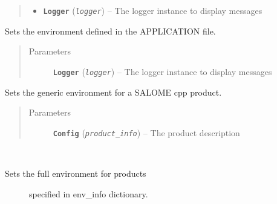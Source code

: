 \documentclass[a4paper,10pt,english]{sphinxmanual}
\begin{document}
\begin{fulllineitems}
\begin{fulllineitems}
\begin{quote}
\begin{description}
\begin{itemize}
\item {} 
\textbf{\texttt{Logger}} (\emph{\texttt{logger}}) -- The logger instance to display messages

\end{itemize}

\end{description}\end{quote}

\end{fulllineitems}


\begin{fulllineitems}
\label{commands/apidoc/src:src.environment.SalomeEnviron.set_application_env}
Sets the environment defined in the APPLICATION file.
\begin{quote}\begin{description}
\item[{Parameters}] \leavevmode
\textbf{\texttt{Logger}} (\emph{\texttt{logger}}) -- The logger instance to display messages

\end{description}\end{quote}

\end{fulllineitems}


\begin{fulllineitems}
\label{commands/apidoc/src:src.environment.SalomeEnviron.set_cpp_env}
Sets the generic environment for a SALOME cpp product.
\begin{quote}\begin{description}
\item[{Parameters}] \leavevmode
\textbf{\texttt{Config}} (\emph{\texttt{product\_info}}) -- The product description

\end{description}\end{quote}

\end{fulllineitems}


\begin{fulllineitems}
\label{commands/apidoc/src:src.environment.SalomeEnviron.set_full_environ}~\begin{description}
\item[{Sets the full environment for products }] \leavevmode
specified in env\_info dictionary.


\end{description}
\end{fulllineitems}
\end{fulllineitems}
\end{document}
